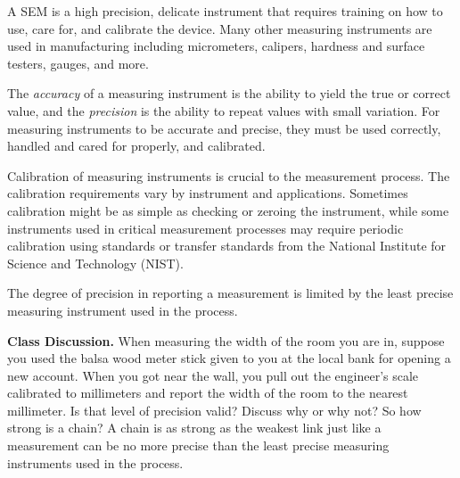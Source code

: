 \documentclass{ximera}
\begin{document}
\begin{center}
      \end{center}

A SEM is a high precision, delicate instrument that requires training on how to use, care for, and calibrate the device. Many other measuring instruments are used in manufacturing including micrometers, calipers, hardness and surface testers, gauges, and more. 

The \emph{accuracy} of a measuring instrument is the ability to yield the true or correct value, and the \emph{precision} is the ability to repeat values with small variation. For measuring instruments to be accurate and precise, they must be used correctly, handled and cared for properly, and calibrated. 

Calibration of measuring instruments is crucial to the measurement process. The calibration requirements vary by instrument and applications. Sometimes calibration might be as simple as checking or zeroing the instrument, while some instruments used in critical measurement processes may require periodic calibration using standards or transfer standards from the National Institute for Science and Technology (NIST).
    
The degree of precision in reporting a measurement is limited by the least precise measuring instrument used in the process. 

\begin{question}\label{q:lengthOfRoom}
\textbf{Class Discussion.} When measuring the width of the room you are in, suppose you used the balsa wood meter stick given to you at the local bank for opening a new account.  When you got near the wall, you pull out the engineer’s scale calibrated to millimeters and report the width of the room to the nearest millimeter.  Is that level of precision valid?  Discuss why or why not?   So how strong is a chain?  A chain is as strong as the weakest link just like a measurement can be no more precise than the least precise measuring instruments used in the process. 
\end{question}
\end{document}
